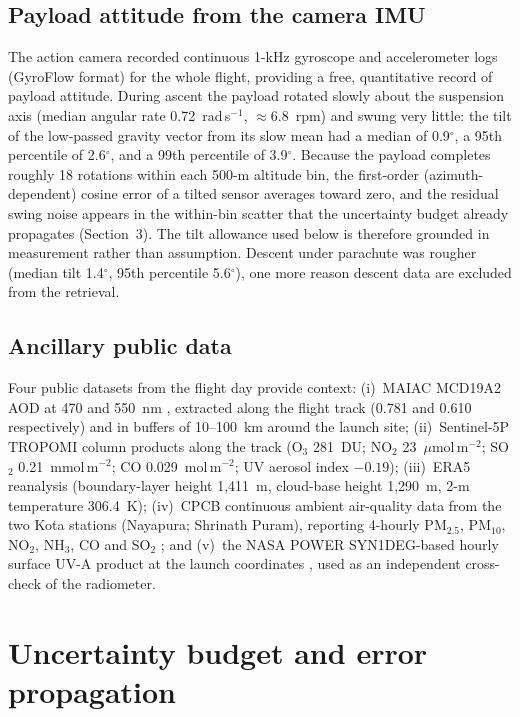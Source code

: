 \documentclass[11pt,a4paper]{article}
\begin{document}
\subsection{Payload attitude from the camera IMU}

The action camera recorded continuous 1-kHz gyroscope and accelerometer logs (GyroFlow
format) for the whole flight, providing a free, quantitative record of payload attitude.
During ascent the payload rotated slowly about the suspension axis (median angular rate
0.72~rad\,s$^{-1}$, $\approx$6.8~rpm) and swung very little: the tilt of the low-passed
gravity vector from its slow mean had a median of 0.9$^\circ$, a 95th percentile of
2.6$^\circ$, and a 99th percentile of 3.9$^\circ$. Because the payload completes roughly
18 rotations within each 500-m altitude bin, the first-order (azimuth-dependent) cosine
error of a tilted sensor averages toward zero, and the residual swing noise appears in
the within-bin scatter that the uncertainty budget already propagates
(Section~3). The tilt allowance used below is therefore grounded in measurement rather
than assumption. Descent under parachute was rougher (median tilt 1.4$^\circ$, 95th
percentile 5.6$^\circ$), one more reason descent data are excluded from the retrieval.

\subsection{Ancillary public data}

Four public datasets from the flight day provide context: (i)~MAIAC MCD19A2 AOD at 470 and
550~nm \cite{lyapustin2018}, extracted along the flight track (0.781 and 0.610
respectively) and in buffers of 10--100~km around the launch site; (ii)~Sentinel-5P TROPOMI
\cite{veefkind2012} column products along the track (O$_3$ 281~DU; NO$_2$
23~$\mu$mol\,m$^{-2}$; SO$_2$ 0.21~mmol\,m$^{-2}$; CO 0.029~mol\,m$^{-2}$; UV aerosol index
$-0.19$); (iii)~ERA5 reanalysis \cite{hersbach2020} (boundary-layer height 1{,}411~m,
cloud-base height 1{,}290~m, 2-m temperature 306.4~K); (iv)~CPCB continuous
ambient air-quality data from the two Kota stations (Nayapura; Shrinath Puram), reporting
4-hourly PM$_{2.5}$, PM$_{10}$, NO$_2$, NH$_3$, CO and SO$_2$ \cite{cpcb}; and (v)~the
NASA POWER SYN1DEG-based hourly surface UV-A product at the launch coordinates
\cite{power}, used as an independent cross-check of the radiometer.

\section{Uncertainty budget and error propagation}
\end{document}

